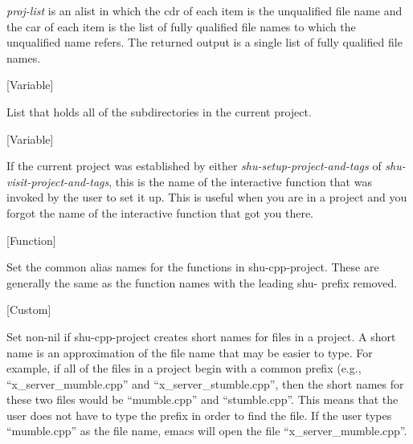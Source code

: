 \begin{doc-string}
\emph{proj-list} is an alist in which the cdr of each item is the unqualified file name
and the car of each item is the list of fully qualified file names to which
the unqualified name refers.  The returned output is a single list of fully
qualified file names.
\end{doc-string}

\vspace{1em}
\noindent
{}
\usebox{\funcname}
 \hfill [Variable]

\begin{doc-string}
List that holds all of the subdirectories in the current project.
\end{doc-string}

\vspace{1em}
\noindent
{}
\usebox{\funcname}
 \hfill [Variable]

\begin{doc-string}
If the current project was established by either \emph{shu-setup-project-and-tags}
of \emph{shu-visit-project-and-tags}, this is the name of the interactive function that
was invoked by the user to set it up.  This is useful when you are in a project
and you forgot the name of the interactive function that got you there.
\end{doc-string}

\vspace{1em}
\noindent
{}
\usebox{\funcname}
 \hfill [Function]

\begin{doc-string}
Set the common alias names for the functions in shu-cpp-project.
These are generally the same as the function names with the leading
shu- prefix removed.
\end{doc-string}

\vspace{1em}
\noindent
{}
\usebox{\funcname}
 \hfill [Custom]

\begin{doc-string}
Set non-nil if shu-cpp-project creates short names for files in a project.  A
short name is an approximation of the file name that may be easier to type.  For
example, if all of the files in a project begin with a common prefix (e.g.,
``x\_server\_mumble.cpp'' and ``x\_server\_stumble.cpp'', then the short names for
these two files would be ``mumble.cpp'' and ``stumble.cpp''.  This means that
the user does not have to type the prefix in order to find the file.  If the
user types ``mumble.cpp'' as the file name, emacs will open the file
``x\_server\_mumble.cpp''.
\end{doc-string}

